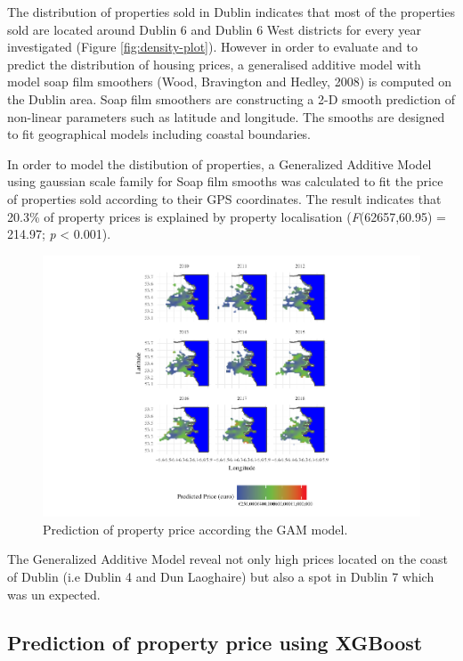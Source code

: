 \documentclass[]{elsarticle} %
\begin{document}
The distribution of properties sold in Dublin indicates that most of the
properties sold are located around Dublin 6 and Dublin 6 West districts
for every year investigated (Figure \ref{fig:density-plot}). However in
order to evaluate and to predict the distribution of housing prices, a
generalised additive model with model soap film smoothers (Wood,
Bravington and Hedley, 2008) is computed on the Dublin area. Soap film
smoothers are constructing a 2-D smooth prediction of non-linear
parameters such as latitude and longitude. The smooths are designed to
fit geographical models including coastal boundaries.

In order to model the distibution of properties, a Generalized Additive
Model using gaussian scale family for Soap film smooths was calculated
to fit the price of properties sold according to their GPS coordinates.
The result indicates that 20.3\% of property prices is explained by
property localisation (\emph{F}(62657,60.95) = 214.97; \emph{p}
\textless{} 0.001).

\begin{figure}[H]

{\centering \includegraphics{property_price_paper_new_files/figure-latex/gam-plot-1} 

}

\caption{Prediction of property price according the GAM model.}\label{fig:gam-plot}
\end{figure}

The Generalized Additive Model reveal not only high prices located on
the coast of Dublin (i.e Dublin 4 and Dun Laoghaire) but also a spot in
Dublin 7 which was un expected.

\subsection{Prediction of property price using
XGBoost}\label{prediction-of-property-price-using-xgboost}
\end{document}
